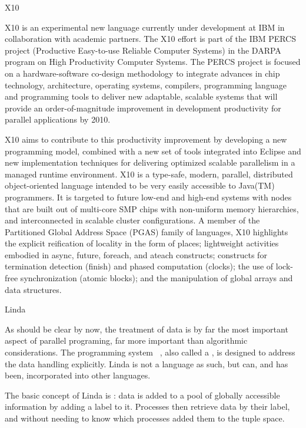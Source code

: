 
 {X10}

X10 is an experimental new language currently under development at
IBM in collaboration with academic partners. The X10 effort
is part of the IBM PERCS project (Productive Easy-to-use Reliable
Computer Systems) in the DARPA program on High Productivity Computer
Systems. The PERCS project is focused on a hardware-software co-design
methodology to integrate advances in chip technology, architecture,
operating systems, compilers, programming language and programming
tools to deliver new adaptable, scalable systems that will provide an
order-of-magnitude improvement in development productivity for
parallel applications by 2010.

X10 aims to contribute to this productivity improvement by developing
a new programming model, combined with a new set of tools integrated
into Eclipse and new implementation techniques for delivering
optimized scalable parallelism in a managed runtime environment. X10
is a type-safe, modern, parallel, distributed object-oriented language
intended to be very easily accessible to Java(TM) programmers. It is
targeted to future low-end and high-end systems with nodes that are
built out of multi-core SMP chips with non-uniform memory hierarchies,
and interconnected in scalable cluster configurations. A member of the
Partitioned Global Address Space (PGAS) family of languages, X10
highlights the explicit reification of locality in the form of places;
lightweight activities embodied in async, future, foreach, and ateach
constructs; constructs for termination detection (finish) and phased
computation (clocks); the use of lock-free synchronization (atomic
blocks); and the manipulation of global arrays and data structures.


 {Linda}

As should be clear by now, the treatment of data is by far the most
important aspect of parallel programing, far more important than
algorithmic considerations. The programming system
~\cite{Gelernter85generativecommunication,Linda-CACM}, also called a
, is designed to address the data
handling explicitly. Linda is not a language as such, but can, and has
been, incorporated into other languages.

The basic concept of Linda is : data is added
to a pool of globally accessible information by adding a label to
it. Processes then retrieve data by their label, and without needing to
know which processes added them to the tuple space.

